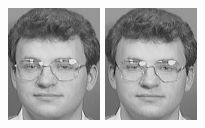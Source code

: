 \begin{figure}[ht]
 \includegraphics[width=\columnwidth/11]{ch3/figures/s6_5.png}
 \includegraphics[width=\columnwidth/11]{ch3/figures/s6_6.png}

\end{figure}
